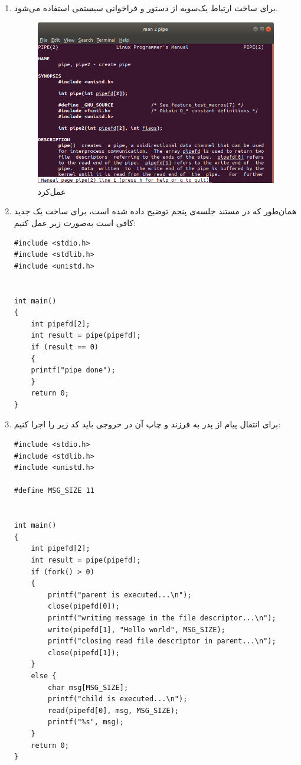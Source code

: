  
\begin{enumerate}
 	\item برای ساخت ارتباط یک‌سویه از دستور و فراخوانی سیستمی  استفاده می‌شود.
 	
 	\begin{figure}[!hbpt]
 		\centering
 		\includegraphics[scale=0.5]{./img/pipe.png}
 		\caption{عمل‌کرد }
 	\end{figure}
 	\item 
 	همان‌طور که در مستند جلسه‌ی پنجم توضیح داده شده است، برای ساخت یک  جدید کافی است به‌صورت زیر عمل کنیم:
	\begin{Verbatim}[tabsize=4]
#include <stdio.h>
#include <stdlib.h>
#include <unistd.h>


int main()
{
	int pipefd[2];
	int result = pipe(pipefd);
	if (result == 0)
	{
	printf("pipe done");
	}
	return 0;
}
 	\end{Verbatim}
	\item 
	برای انتقال پیام  از پدر به فرزند و چاپ آن در خروجی باید کد زیر را اجرا کنیم:


	\begin{Verbatim}[tabsize=4]
#include <stdio.h>
#include <stdlib.h>
#include <unistd.h>

#define MSG_SIZE 11


int main()
{
	int pipefd[2];
	int result = pipe(pipefd);
	if (fork() > 0)
	{
		printf("parent is executed...\n");
		close(pipefd[0]);
		printf("writing message in the file descriptor...\n");
		write(pipefd[1], "Hello world", MSG_SIZE);
		printf("closing read file descriptor in parent...\n");
		close(pipefd[1]);
	}
	else {
		char msg[MSG_SIZE];
		printf("child is executed...\n");
		read(pipefd[0], msg, MSG_SIZE);
		printf("%s", msg);
	}
	return 0;
}
	\end{Verbatim}
	


\end{enumerate}
